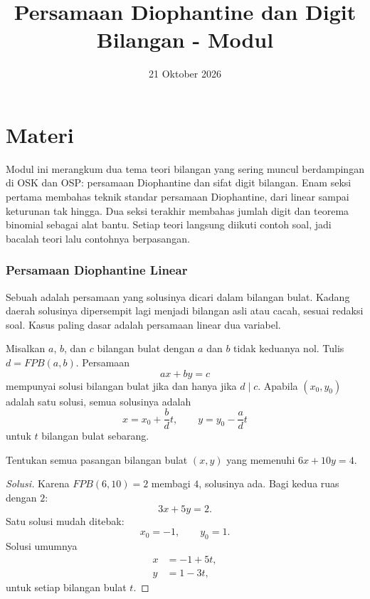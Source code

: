 \documentclass[12pt]{scrartcl}
\title{Persamaan Diophantine dan Digit Bilangan - Modul}
\date{21 Oktober 2026}
\begin{document}
\maketitle

\renewcommand*\contentsname{Daftar Isi}
\tableofcontents

\newpage

\part*{Materi}

Modul ini merangkum dua tema teori bilangan yang sering muncul berdampingan
di OSK dan OSP: persamaan Diophantine dan sifat digit bilangan.
Enam seksi pertama membahas teknik standar persamaan Diophantine,
dari linear sampai keturunan tak hingga.
Dua seksi terakhir membahas jumlah digit dan teorema binomial sebagai alat bantu.
Setiap teori langsung diikuti contoh soal,
jadi bacalah teori lalu contohnya berpasangan.

\section{Persamaan Diophantine Linear}

Sebuah  adalah persamaan
yang solusinya dicari dalam bilangan bulat.
Kadang daerah solusinya dipersempit lagi menjadi bilangan asli atau cacah,
sesuai redaksi soal.
Kasus paling dasar adalah persamaan linear dua variabel.

\begin{theorem}
Misalkan $a$, $b$, dan $c$ bilangan bulat dengan $a$ dan $b$ tidak keduanya nol.
Tulis $d = FPB(a, b)$. Persamaan
\[ ax + by = c \]
mempunyai solusi bilangan bulat jika dan hanya jika $d \mid c$.
Apabila $(x_0, y_0)$ adalah satu solusi, semua solusinya adalah
\[ x = x_0 + \frac{b}{d}t, \qquad y = y_0 - \frac{a}{d}t \]
untuk $t$ bilangan bulat sebarang.
\end{theorem}

\begin{example}
Tentukan semua pasangan bilangan bulat $(x, y)$ yang memenuhi $6x + 10y = 4$.
\end{example}
\begin{proof}[Solusi]
Karena $FPB(6, 10) = 2$ membagi $4$, solusinya ada.
Bagi kedua ruas dengan $2$:
\[ 3x + 5y = 2. \]
Satu solusi mudah ditebak:
\[ x_0 = -1, \qquad y_0 = 1. \]
Solusi umumnya
\begin{align*}
x &= -1 + 5t, \\
y &= 1 - 3t,
\end{align*}
untuk setiap bilangan bulat $t$.
\end{proof}
\end{document}
